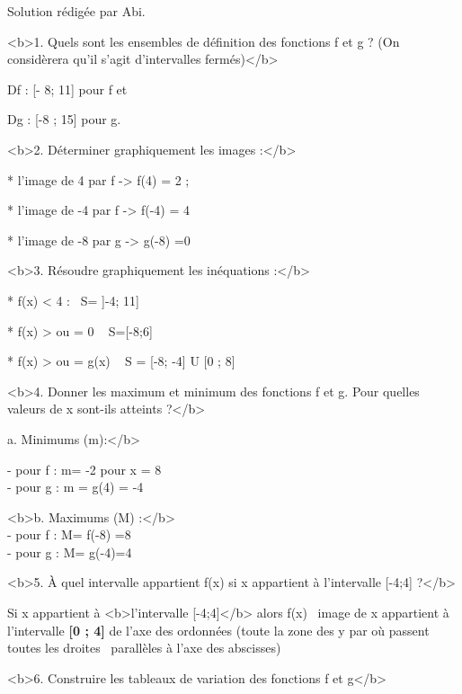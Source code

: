 \begin{corrige}
     Solution rédigée par Abi.
\par
     <b>1. Quels sont les ensembles de définition des fonctions f et g ? (On considèrera qu'il s'agit d'intervalles fermés)</b>
\par
     Df : [- 8; 11] pour f et~
     \par
     Dg : [-8 ; 15] pour g.
\par
     <b>2. Déterminer graphiquement les images :</b>
\par
     * l'image de 4 par f -> f(4) = 2 ; ~
     \par
     * l'image de -4 par f -> f(-4) = 4
     \par
     * l'image de -8 par g -> g(-8) =0
\par
     <b>3. Résoudre graphiquement les inéquations :</b>
\par
     * f(x) < 4 : ~S= ]-4; 11]
     \par
     * f(x) > ou = 0 ~ S=[-8;6]
     \par
     * f(x) > ou = g(x)  ~ S = [-8; -4] U [0 ; 8]
\par
     <b>4. Donner les maximum et minimum des fonctions f et g. Pour quelles valeurs de x sont-ils atteints ?</b>

\par a. Minimums (m):</b>
\par
 - pour f : m= -2 pour x = 8
\\- pour g : m = g(4) = -4
    
\par <b>b. Maximums (M) :</b>
\\ - pour f : M= f(-8) =8~
\\ - pour g : M= g(-4)=4~
\par
     <b>5. À quel intervalle appartient f(x) si x appartient à l'intervalle [-4;4] ?</b>
\par
     Si x appartient à <b>l'intervalle [-4;4]</b> alors f(x) ~image de x appartient à l'intervalle \textbf{[0 ; 4]} de l'axe des ordonnées (toute la zone des y par où passent toutes les droites ~parallèles à l'axe des abscisses)
\par
     <b>6. Construire les tableaux de variation des fonctions f et g</b>
\par
\begin{center}
\begin{extern}%
\end{extern}
\end{center}
\end{corrige}

